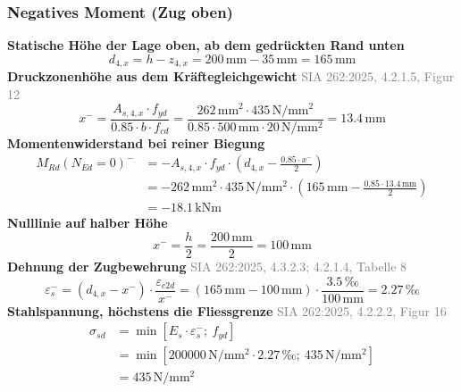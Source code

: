 \documentclass[11pt,a4paper]{article}
\newcommand{\normref}[1]{{\small\textcolor{gray}{#1}}}
\begin{document}
\subsubsection{Negatives Moment (Zug oben)}
\noindent\textbf{Statische Höhe der Lage oben, ab dem gedrückten Rand unten}
\begin{equation*}
d_{4,x} = h - z_{4,x} = 200\,\mathrm{mm} - 35\,\mathrm{mm} = 165\,\mathrm{mm}
\end{equation*}
\noindent\textbf{Druckzonenhöhe aus dem Kräftegleichgewicht} \hfill \normref{SIA 262:2025, 4.2.1.5, Figur 12}
\begin{equation*}
x^{-} = \frac{A_{s,4,x} \cdot f_{yd}}{0.85 \cdot b \cdot f_{cd}} = \frac{262\,\mathrm{mm}^{2} \cdot 435\,\mathrm{N}/\mathrm{mm}^{2}}{0.85 \cdot 500\,\mathrm{mm} \cdot 20\,\mathrm{N}/\mathrm{mm}^{2}} = 13.4\,\mathrm{mm}
\end{equation*}
\noindent\textbf{Momentenwiderstand bei reiner Biegung}
\begin{equation*}
\begin{aligned}
  M_{Rd}(N_{Ed}=0)^{-} &= -A_{s,4,x} \cdot f_{yd} \cdot \left(d_{4,x} - \frac{0.85 \cdot x^{-}}{2}\right) \\
  &= -262\,\mathrm{mm}^{2} \cdot 435\,\mathrm{N}/\mathrm{mm}^{2} \cdot \left(165\,\mathrm{mm} - \frac{0.85 \cdot 13.4\,\mathrm{mm}}{2}\right) \\
  &= -18.1\,\mathrm{kNm}
\end{aligned}
\end{equation*}
\noindent\textbf{Nulllinie auf halber Höhe}
\begin{equation*}
x^{-} = \frac{h}{2} = \frac{200\,\mathrm{mm}}{2} = 100\,\mathrm{mm}
\end{equation*}
\noindent\textbf{Dehnung der Zugbewehrung} \hfill \normref{SIA 262:2025, 4.3.2.3; 4.2.1.4, Tabelle 8}
\begin{equation*}
\varepsilon_s^{-} = \left(d_{4,x} - x^{-}\right) \cdot \frac{\varepsilon_{c2d}}{x^{-}} = \left(165\,\mathrm{mm} - 100\,\mathrm{mm}\right) \cdot \frac{3.5\,\text{‰}}{100\,\mathrm{mm}} = 2.27\,\text{‰}
\end{equation*}
\noindent\textbf{Stahlspannung, höchstens die Fliessgrenze} \hfill \normref{SIA 262:2025, 4.2.2.2, Figur 16}
\begin{equation*}
\begin{aligned}
  \sigma_{sd} &= \min\left[E_s \cdot \varepsilon_s^{-};\ f_{yd}\right] \\
  &= \min\left[200000\,\mathrm{N}/\mathrm{mm}^{2} \cdot 2.27\,\text{‰};\ 435\,\mathrm{N}/\mathrm{mm}^{2}\right] \\
  &= 435\,\mathrm{N}/\mathrm{mm}^{2}
\end{aligned}
\end{equation*}
\end{document}
